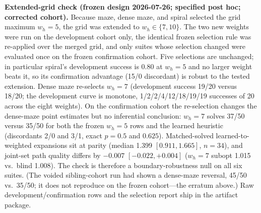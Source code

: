 \documentclass[letterpaper]{article} %
\begin{document}
\textbf{Extended-grid check (frozen design 2026-07-26; specified post hoc; corrected cohort).} Because maze, dense maze, and spiral selected the grid maximum $w_h{=}5$, the grid was extended to $w_h \in \{7, 10\}$. The two new weights were run on the development cohort only, the identical frozen selection rule was re-applied over the merged grid, and only suites whose selection changed were evaluated once on the frozen confirmation cohort. Five selections are unchanged; in particular spiral's development success is 0.80 at $w_h{=}5$ and no larger weight beats it, so its confirmation advantage (15/0 discordant) is robust to the tested extension. Dense maze re-selects $w_h{=}7$ (development success 19/20 versus 18/20; the development curve is monotone, 1/2/2/4/12/18/19/19 successes of 20 across the eight weights). On the confirmation cohort the re-selection changes the dense-maze point estimates but no inferential conclusion: $w_h{=}7$ solves 37/50 versus 35/50 for both the frozen $w_h{=}5$ rows and the learned heuristic (discordants 2/0 and 3/1, exact $p{=}0.5$ and $0.625$). Matched-solved learned-to-weighted expansions sit at parity (median 1.399 $[0.911, 1.665]$, $n{=}34$), and joint-set path quality differs by $-0.007$ $[-0.022, +0.004]$ ($w_h{=}7$ subopt 1.015 vs.\ blind 1.008). The check is therefore a boundary-robustness null on all six suites. (The voided sibling-cohort run had shown a dense-maze reversal, 45/50 vs.\ 35/50; it does not reproduce on the frozen cohort---the erratum above.) Raw development/confirmation rows and the selection report ship in the artifact package.
\end{document}
